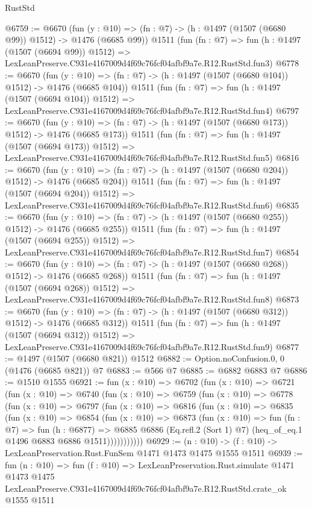 \begin{lexlean}{RustStd}
\begin{coremodule}
@6759 := @6670
    (fun (y : @10) => (fn : @7) -> (h : @1497 (@1507 (@6680 @99)) @1512) -> @1476 (@6685 @99))
    @1511
    (fun (fn : @7) =>
    fun (h : @1497 (@1507 (@6694 @99)) @1512) =>
    LexLeanPreserve.C931e4167009d4f69c76fcf04afbf9a7e.R12.RustStd.fun3)
@6778 := @6670
    (fun (y : @10) => (fn : @7) -> (h : @1497 (@1507 (@6680 @104)) @1512) -> @1476 (@6685 @104))
    @1511
    (fun (fn : @7) =>
    fun (h : @1497 (@1507 (@6694 @104)) @1512) =>
    LexLeanPreserve.C931e4167009d4f69c76fcf04afbf9a7e.R12.RustStd.fun4)
@6797 := @6670
    (fun (y : @10) => (fn : @7) -> (h : @1497 (@1507 (@6680 @173)) @1512) -> @1476 (@6685 @173))
    @1511
    (fun (fn : @7) =>
    fun (h : @1497 (@1507 (@6694 @173)) @1512) =>
    LexLeanPreserve.C931e4167009d4f69c76fcf04afbf9a7e.R12.RustStd.fun5)
@6816 := @6670
    (fun (y : @10) => (fn : @7) -> (h : @1497 (@1507 (@6680 @204)) @1512) -> @1476 (@6685 @204))
    @1511
    (fun (fn : @7) =>
    fun (h : @1497 (@1507 (@6694 @204)) @1512) =>
    LexLeanPreserve.C931e4167009d4f69c76fcf04afbf9a7e.R12.RustStd.fun6)
@6835 := @6670
    (fun (y : @10) => (fn : @7) -> (h : @1497 (@1507 (@6680 @255)) @1512) -> @1476 (@6685 @255))
    @1511
    (fun (fn : @7) =>
    fun (h : @1497 (@1507 (@6694 @255)) @1512) =>
    LexLeanPreserve.C931e4167009d4f69c76fcf04afbf9a7e.R12.RustStd.fun7)
@6854 := @6670
    (fun (y : @10) => (fn : @7) -> (h : @1497 (@1507 (@6680 @268)) @1512) -> @1476 (@6685 @268))
    @1511
    (fun (fn : @7) =>
    fun (h : @1497 (@1507 (@6694 @268)) @1512) =>
    LexLeanPreserve.C931e4167009d4f69c76fcf04afbf9a7e.R12.RustStd.fun8)
@6873 := @6670
    (fun (y : @10) => (fn : @7) -> (h : @1497 (@1507 (@6680 @312)) @1512) -> @1476 (@6685 @312))
    @1511
    (fun (fn : @7) =>
    fun (h : @1497 (@1507 (@6694 @312)) @1512) =>
    LexLeanPreserve.C931e4167009d4f69c76fcf04afbf9a7e.R12.RustStd.fun9)
@6877 := @1497 (@1507 (@6680 @821)) @1512
@6882 := Option.noConfusion.{0, 0} (@1476 (@6685 @821)) @7
@6883 := @566 @7
@6885 := @6882 @6883 @7
@6886 := @1510 @1555
@6921 := fun (x : @10) =>
  @6702
    (fun (x : @10) =>
    @6721
      (fun (x : @10) =>
      @6740
        (fun (x : @10) =>
        @6759
          (fun (x : @10) =>
          @6778
            (fun (x : @10) =>
            @6797
              (fun (x : @10) =>
              @6816
                (fun (x : @10) =>
                @6835
                  (fun (x : @10) =>
                  @6854
                    (fun (x : @10) =>
                    @6873
                      (fun (x : @10) =>
                      fun (fn : @7) =>
                      fun (h : @6877) =>
                      @6885
                        @6886
                        (Eq.refl.{2} (Sort 1) @7)
                        (heq_of_eq.{1} @1496 @6883 @6886 @1511)))))))))))
@6929 := (n : @10) -> (f : @10) -> LexLeanPreservation.Rust.FunSem @1471 @1473 @1475 @1555 @1511
@6939 := fun (n : @10) =>
  fun (f : @10) =>
  LexLeanPreservation.Rust.simulate
    @1471
    @1473
    @1475
    LexLeanPreserve.C931e4167009d4f69c76fcf04afbf9a7e.R12.RustStd.crate_ok
    @1555
    @1511
\end{coremodule}
\end{lexlean}
